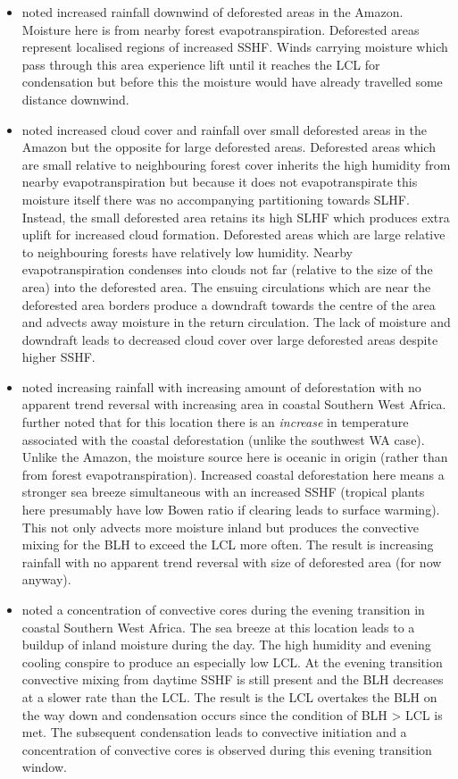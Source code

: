 \begin{itemize}
	\item \citet{khanna2017} noted increased rainfall downwind of deforested areas in the Amazon. Moisture here is from nearby forest evapotranspiration. Deforested areas represent localised regions of increased \ac{SSHF}. Winds carrying moisture which pass through this area experience lift until it reaches the \ac{LCL} for condensation but before this the moisture would have already travelled some distance downwind.
	\item \citet{khanna2017} noted increased cloud cover and rainfall over small deforested areas in the Amazon but the opposite for large deforested areas. Deforested areas which are small relative to neighbouring forest cover inherits the high humidity from nearby evapotranspiration but because it does not evapotranspirate this moisture itself there was no accompanying partitioning towards \ac{SLHF}. Instead, the small deforested area retains its high \ac{SLHF} which produces extra uplift for increased cloud formation. Deforested areas which are large relative to neighbouring forests have relatively low humidity. Nearby evapotranspiration condenses into clouds not far (relative to the size of the area) into the deforested area. The ensuing circulations which are near the deforested area borders produce a downdraft towards the centre of the area and advects away moisture in the return circulation. The lack of moisture and downdraft leads to decreased cloud cover over large deforested areas despite higher \ac{SSHF}.
	\item \citet{taylor2022} noted increasing rainfall with increasing amount of deforestation with no apparent trend reversal with increasing area in coastal Southern West Africa. \citet{taylor2022} further noted that for this location there is an \textit{increase} in temperature associated with the coastal deforestation (unlike the southwest \ac{WA} case). Unlike the Amazon, the moisture source here is oceanic in origin (rather than from forest evapotranspiration). Increased coastal deforestation here means a stronger sea breeze simultaneous with an increased \ac{SSHF} (tropical plants here presumably have low Bowen ratio if clearing leads to surface warming). This not only advects more moisture inland but produces the convective mixing for the \ac{BLH} to exceed the \ac{LCL} more often. The result is increasing rainfall with no apparent trend reversal with size of deforested area (for now anyway).
	\item \citet{taylor2022} noted a concentration of convective cores during the evening transition in coastal Southern West Africa. The sea breeze at this location leads to a buildup of inland moisture during the day. The high humidity and evening cooling conspire to produce an especially low \ac{LCL}. At the evening transition convective mixing from daytime \ac{SSHF} is still present and the \ac{BLH} decreases at a slower rate than the \ac{LCL}. The result is the \ac{LCL} overtakes the \ac{BLH} on the way down and condensation occurs since the condition of \ac{BLH} > \ac{LCL} is met. The subsequent condensation leads to convective initiation and a concentration of convective cores is observed during this evening transition window. 

\end{itemize}
